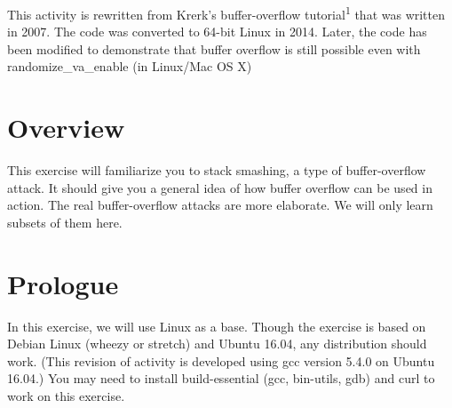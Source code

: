 \documentclass[a4paper, 10pt]{article}
\begin{document}
\subject
{}

\noindent This activity is rewritten from Krerk's buffer-overflow tutorial\textsuperscript{1} that was written in 2007.
The code was converted to 64-bit Linux in 2014.
Later, the code has been modified to demonstrate that buffer overflow is still possible
even with randomize\_va\_enable (in Linux/Mac OS X)


\section*{Overview}

This exercise will familiarize you to stack smashing, a type of buffer-overflow attack.
It should give you a general idea of how buffer overflow can be used in action.
The real buffer-overflow attacks are more elaborate.
We will only learn subsets of them here.

\section*{Prologue}

In this exercise, we will use Linux as a base.
Though the exercise is based on Debian Linux (wheezy or stretch) and Ubuntu 16.04, any distribution should work.
(This revision of activity is developed using gcc version 5.4.0 on Ubuntu 16.04.)
You may need to install build-essential (gcc, bin-utils, gdb) and curl to work on this exercise.

\myspace
\end{document}
